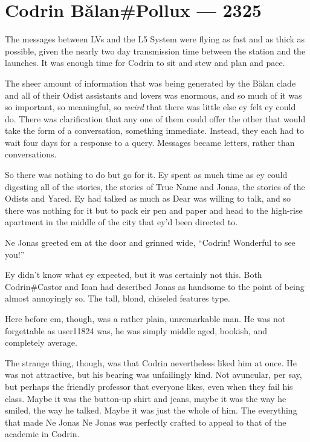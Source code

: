 \hypertarget{codrin-bux103lanpollux-2325}{%
\chapter{Codrin Bălan\#Pollux — 2325}\label{codrin-bux103lanpollux-2325}}

The messages between LVs and the L5 System were flying as fast and as thick as possible, given the nearly two day transmission time between the station and the launches. It was enough time for Codrin to sit and stew and plan and pace.

The sheer amount of information that was being generated by the Bălan clade and all of their Odist assistants and lovers was enormous, and so much of it was so important, so meaningful, so \emph{weird} that there was little else ey felt ey could do. There was clarification that any one of them could offer the other that would take the form of a conversation, something immediate. Instead, they each had to wait four days for a response to a query. Messages became letters, rather than conversations.

So there was nothing to do but go for it. Ey spent as much time as ey could digesting all of the stories, the stories of True Name and Jonas, the stories of the Odists and Yared. Ey had talked as much as Dear was willing to talk, and so there was nothing for it but to pack eir pen and paper and head to the high-rise apartment in the middle of the city that ey'd been directed to.

Ne Jonas greeted em at the door and grinned wide, ``Codrin! Wonderful to see you!''

Ey didn't know what ey expected, but it was certainly not this. Both Codrin\#Castor and Ioan had described Jonas as handsome to the point of being almost annoyingly so. The tall, blond, chiseled features type.

Here before em, though, was a rather plain, unremarkable man. He was not forgettable as user11824 was, he was simply middle aged, bookish, and completely average.

The strange thing, though, was that Codrin nevertheless liked him at once. He was not attractive, but his bearing was unfailingly kind. Not avuncular, per say, but perhaps the friendly professor that everyone likes, even when they fail his class. Maybe it was the button-up shirt and jeans, maybe it was the way he smiled, the way he talked. Maybe it was just the whole of him. The everything that made Ne Jonas Ne Jonas was perfectly crafted to appeal to that of the academic in Codrin.

